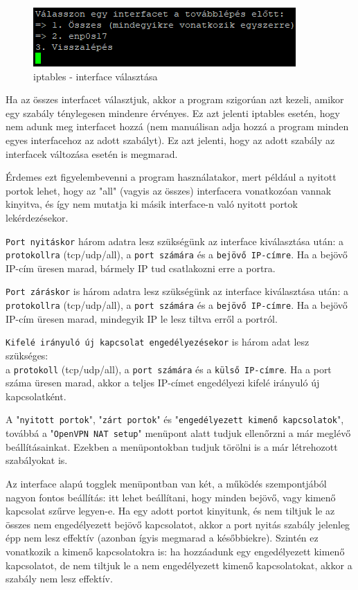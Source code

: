 \begin{figure}[h]
\centering
\includegraphics[scale=1]{images/iptables_interface_select.png}
\caption{iptables - interface választása}
\end{figure}

Ha az összes interfacet választjuk, akkor a program szigorúan azt kezeli, amikor egy szabály ténylegesen mindenre érvényes. Ez azt jelenti iptables esetén, hogy nem adunk meg interfacet hozzá (nem manuálisan adja hozzá a program minden egyes interfacehoz az adott szabályt). Ez azt jelenti, hogy az adott szabály az interfacek változása esetén is megmarad. 

Érdemes ezt figyelembevenni a program használatakor, mert például a nyitott portok lehet, hogy az "all" (vagyis az összes) interfacera vonatkozóan vannak kinyitva, és így nem mutatja ki másik interface-n való nyitott portok lekérdezésekor.

\pagebreak

\texttt{Port nyitáskor} három adatra lesz szükségünk az interface kiválasztása után: a \texttt{protokollra} (tcp/udp/all), a \texttt{port számára} és a \texttt{bejövő IP-címre}. Ha a bejövő IP-cím üresen marad, bármely IP tud csatlakozni erre a portra.

\texttt{Port záráskor} is három adatra lesz szükségünk az interface kiválasztása után: a \texttt{protokollra} (tcp/udp/all), a \texttt{port számára} és a \texttt{bejövő IP-címre}. Ha a bejövő IP-cím üresen marad, mindegyik IP le lesz tiltva erről a portról.

\texttt{Kifelé irányuló új kapcsolat engedélyezésekor} is három adat lesz szükséges: \\a \texttt{protokoll} (tcp/udp/all), a \texttt{port számára} és a \texttt{külső IP-címre}. Ha a port száma üresen marad, akkor a teljes IP-címet engedélyezi kifelé irányuló új kapcsolatként.

A "\texttt{nyitott portok}", "\texttt{zárt portok}" és "\texttt{engedélyezett kimenő kapcsolatok}", továbbá a "\texttt{OpenVPN NAT setup}" menüpont alatt tudjuk ellenőrzni a már meglévő beállításainkat. Ezekben a menüpontokban tudjuk törölni is a már létrehozott szabályokat is.

Az interface alapú togglek menüpontban van két, a működés szempontjából nagyon fontos beállítás: itt lehet beállítani, hogy minden bejövő, vagy kimenő kapcsolat szűrve legyen-e. Ha egy adott portot kinyitunk, és nem tiltjuk le az összes nem engedélyezett bejövő kapcsolatot, akkor a port nyitás szabály jelenleg épp nem lesz effektív (azonban ígyis megmarad a későbbiekre). Szintén ez vonatkozik a kimenő kapcsolatokra is: ha hozzáadunk egy engedélyezett kimenő kapcsolatot, de nem tiltjuk le a nem engedélyezett kimenő kapcsolatokat, akkor a szabály nem lesz effektív.

